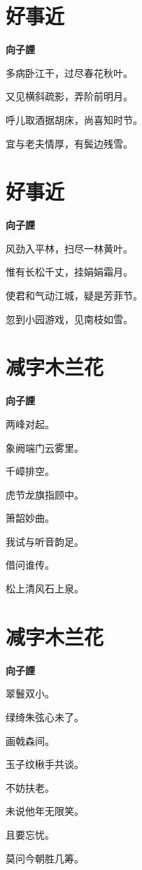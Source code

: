 \documentclass[12pt,a4paper]{ctexbook}
\begin{document}
\section{好事近}
\textbf{向子諲}\par\vspace{0.5em}
多病卧江干，过尽春花秋叶。\par
又见横斜疏影，弄阶前明月。\par
呼儿取酒据胡床，尚喜知时节。\par
宜与老夫情厚，有鬓边残雪。\par

\section{好事近}
\textbf{向子諲}\par\vspace{0.5em}
风劲入平林，扫尽一林黄叶。\par
惟有长松千丈，挂娟娟霜月。\par
使君和气动江城，疑是芳菲节。\par
忽到小园游戏，见南枝如雪。\par

\section{减字木兰花}
\textbf{向子諲}\par\vspace{0.5em}
两峰对起。\par
象阙端门云雾里。\par
千嶂排空。\par
虎节龙旗指顾中。\par
箫韶妙曲。\par
我试与听音韵足。\par
借问谁传。\par
松上清风石上泉。\par

\section{减字木兰花}
\textbf{向子諲}\par\vspace{0.5em}
翠鬟双小。\par
绿绮朱弦心未了。\par
画戟森间。\par
玉子纹楸手共谈。\par
不妨扶老。\par
未说他年无限笑。\par
且要忘忧。\par
莫问今朝胜几筹。\par
\end{document}
